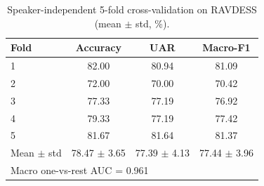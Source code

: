 \begin{table}[t]
\centering
\caption{Speaker-independent 5-fold cross-validation on RAVDESS (mean $\pm$ std, \%).}
\label{tab:cv}
\begin{tabular}{lccc}
\toprule
Fold & Accuracy & UAR & Macro-F1 \\
\midrule
1 & 82.00 & 80.94 & 81.09 \\
2 & 72.00 & 70.00 & 70.42 \\
3 & 77.33 & 77.19 & 76.92 \\
4 & 79.33 & 77.19 & 77.42 \\
5 & 81.67 & 81.64 & 81.37 \\
\midrule
Mean $\pm$ std & 78.47 $\pm$ 3.65 & 77.39 $\pm$ 4.13 & 77.44 $\pm$ 3.96 \\
\multicolumn{4}{l}{Macro one-vs-rest AUC = 0.961} \\
\bottomrule
\end{tabular}
\end{table}